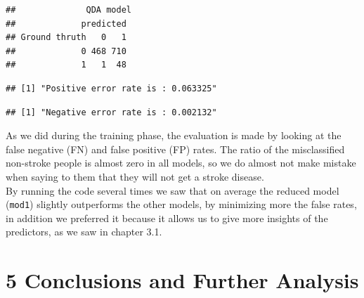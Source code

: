 \documentclass[
]{article}
\newenvironment{Shaded}{\begin{snugshade}}{\end{snugshade}}
\newcommand{\AttributeTok}[1]{\textcolor[rgb]{0.77,0.63,0.00}{#1}}
\newcommand{\CommentTok}[1]{\textcolor[rgb]{0.56,0.35,0.01}{\textit{#1}}}
\newcommand{\DecValTok}[1]{\textcolor[rgb]{0.00,0.00,0.81}{#1}}
\newcommand{\FunctionTok}[1]{\textcolor[rgb]{0.00,0.00,0.00}{#1}}
\newcommand{\NormalTok}[1]{#1}
\newcommand{\OtherTok}[1]{\textcolor[rgb]{0.56,0.35,0.01}{#1}}
\newcommand{\SpecialCharTok}[1]{\textcolor[rgb]{0.00,0.00,0.00}{#1}}
\newcommand{\StringTok}[1]{\textcolor[rgb]{0.31,0.60,0.02}{#1}}
\begin{document}
\begin{Shaded}
\end{Shaded}

\begin{verbatim}
##              QDA model
##             predicted
## Ground thruth   0   1
##             0 468 710
##             1   1  48
\end{verbatim}

\begin{verbatim}
## [1] "Positive error rate is : 0.063325"
\end{verbatim}

\begin{verbatim}
## [1] "Negative error rate is : 0.002132"
\end{verbatim}

As we did during the training phase, the evaluation is made by looking
at the false negative (FN) and false positive (FP) rates. The ratio of
the misclassified non-stroke people is almost zero in all models, so we
do almost not make mistake when saying to them that they will not get a
stroke disease.\\
By running the code several times we saw that on average the reduced
model (\texttt{mod1}) slightly outperforms the other models, by
minimizing more the false rates, in addition we preferred it because it
allows us to give more insights of the predictors, as we saw in chapter
3.1.

\hypertarget{conclusions-and-further-analysis}{%
\section{5 Conclusions and Further
Analysis}\label{conclusions-and-further-analysis}}
\end{document}

